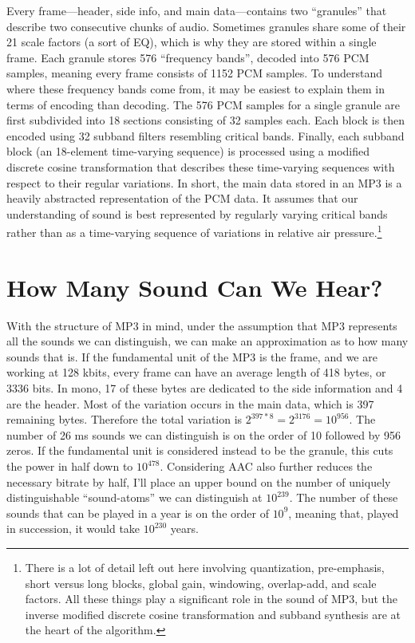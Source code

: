 \documentclass{thesis}
\begin{document}
	Every frame---header, side info, and main data---contains two ``granules'' that describe two consecutive chunks of audio. Sometimes granules share some of their 21 scale factors (a sort of EQ), which is why they are stored within a single frame. Each granule stores 576 ``frequency bands'', decoded into 576 PCM samples, meaning every frame consists of 1152 PCM samples. To understand where these frequency bands come from, it may be easiest to explain them in terms of encoding than decoding. The 576 PCM samples for a single granule are first subdivided into 18 sections consisting of 32 samples each. Each block is then encoded using 32 subband filters resembling critical bands. Finally, each subband block (an 18-element time-varying sequence) is processed using a modified discrete cosine transformation that describes these time-varying sequences with respect to their regular variations. In short, the main data stored in an MP3 is a heavily abstracted representation of the PCM data. It assumes that our understanding of sound is best represented by regularly varying critical bands rather than as a time-varying sequence of variations in relative air pressure.\footnote{There is a lot of detail left out here involving quantization, pre-emphasis, short versus long blocks, global gain, windowing, overlap-add, and scale factors. All these things play a significant role in the sound of MP3, but the inverse modified discrete cosine transformation and subband synthesis are at the heart of the algorithm.}
	
\section{How Many Sound Can We Hear?}

	With the structure of MP3 in mind, under the assumption that MP3 represents all the sounds we can distinguish, we can make an approximation as to how many sounds that is. If the fundamental unit of the MP3 is the frame, and we are working at 128 kbits, every frame can have an average length of 418 bytes, or 3336 bits. In mono, 17 of these bytes are dedicated to the side information and 4 are the header. Most of the variation occurs in the main data, which is 397 remaining bytes. Therefore the total variation is $2^{397*8}=2^{3176}=10^{956}$. The number of 26 ms sounds we can distinguish is on the order of 10 followed by 956 zeros. If the fundamental unit is considered instead to be the granule, this cuts the power in half down to $10^{478}$. Considering AAC also further reduces the necessary bitrate by half, I'll place an upper bound on the number of uniquely distinguishable ``sound-atoms'' we can distinguish at $10^{239}$. The number of these sounds that can be played in a year is on the order of $10^9$, meaning that, played in succession, it would take $10^{230}$ years.
	
\end{document}
